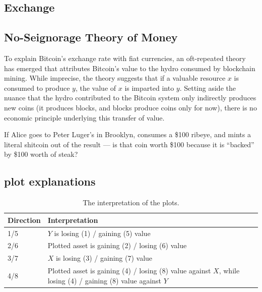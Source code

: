 \subsection{Exchange}

\clearpage
\subsection{No-Seignorage Theory of Money}

To explain Bitcoin's exchange rate with fiat currencies, an oft-repeated theory has emerged that attributes Bitcoin's value to the hydro consumed by blockchain mining. While imprecise, the theory suggests that if a valuable resource $x$ is consumed to produce $y$, the value of $x$ is imparted into $y$. Setting aside the nuance that the hydro contributed to the Bitcoin system only indirectly produces new coins (it produces blocks, and blocks produce coins only for now), there is no economic principle underlying this transfer of value.

If Alice goes to Peter Luger's in Brooklyn, consumes a \$100 ribeye, and mints a literal shitcoin out of the result --- is that coin worth \$100 because it is ``backed'' by \$100 worth of steak?

\subsection{plot explanations}


\begin{table}[t]
\centering
\begin{tabular}{|l|l|}
\hline
\textbf{Direction} & \textbf{Interpretation}   \\ \hline

         1/5                & $Y$ is losing (1) / gaining (5) value \\ \hline
         2/6                & Plotted asset is gaining (2) / losing (6) value \\ \hline         
         3/7                & $X$ is losing (3) / gaining (7) value \\ \hline
         4/8                & \multicolumn{1}{p{12cm}|}{Plotted asset is gaining (4) / losing (8) value against $X$, while losing (4) / gaining (8) value against $Y$} \\ \hline
          
\end{tabular}
\vspace{1em}
\caption{\footnotesize{The interpretation of the plots.}\label{tab:plotlegend}}
\end{table}



